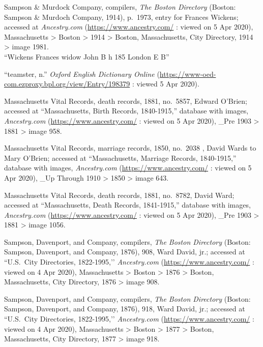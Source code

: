 \begin{thebibliography}{99}
	Sampson \& Murdock Company, compilers, \textit{The Boston Directory} (Boston: Sampson \& Murdoch Company, 1914), p.\ 1973, entry for Frances Wickens; accessed at \textit{Ancestry.com} (\url{https://www.ancestry.com/} : viewed on 5 Apr 2020), Massachusetts > Boston > 1914 > Boston, Massachusetts, City Directory, 1914 > image 1981.\\
	``Wickens Frances widow John B h 185 London E B''
	
	``teamster, n.'' \textit{Oxford English Dictionary Online} (\url{https://www-oed-com.ezproxy.bpl.org/view/Entry/198379} : viewed 5 Apr 2020).
	
	Massachusetts Vital Records, death records, 1881, no.\ 5857, Edward O'Brien; accessed at ``Massachusetts, Birth Records, 1840-1915,'' database with images, \textit{Ancestry.com} (\url{https://www.ancestry.com/} : viewed on 5 Apr 2020), \_Pre 1903 > 1881 > image 958.
	
	Massachusetts Vital Records, marriage records, 1850, no.\ 2038 , David Wards to Mary O'Brien; accessed at ``Massachusetts, Marriage Records, 1840-1915,'' database with images, \textit{Ancestry.com} (\url{https://www.ancestry.com/} : viewed on 5 Apr 2020), \_Up Through 1910 > 1850 > image 643.
	
	Massachusetts Vital Records, death records, 1881, no.\ 8782, David Ward; accessed at ``Massachusetts, Death Records, 1841-1915,'' database with images, \textit{Ancestry.com} (\url{https://www.ancestry.com/} : viewed on 5 Apr 2020), \_Pre 1903 > 1881 > image 1056.
	
	Sampson, Davenport, and Company, compilers, \textit{The Boston Directory} (Boston: Sampson, Davenport, and Company, 1876), 908, Ward David, jr.; accessed at ``U.S.\ City Directories, 1822-1995,’’ \textit{Ancestry.com} (\url{https://www.ancestry.com/} : viewed on 4 Apr 2020), Massachusetts > Boston > 1876 > Boston, Massachusetts, City Directory, 1876 > image 908.
	
	Sampson, Davenport, and Company, compilers, \textit{The Boston Directory} (Boston: Sampson, Davenport, and Company, 1876), 918, Ward David, jr.; accessed at ``U.S.\ City Directories, 1822-1995,’’ \textit{Ancestry.com} (\url{https://www.ancestry.com/} : viewed on 4 Apr 2020), Massachusetts > Boston > 1877 > Boston, Massachusetts, City Directory, 1877 > image 918.
	

\end{thebibliography}
